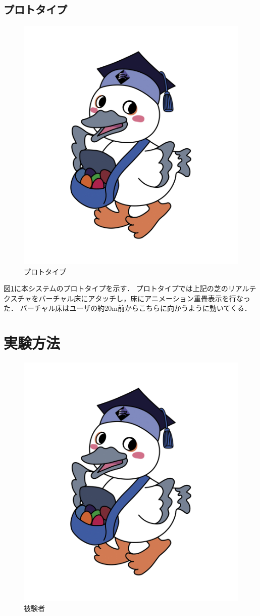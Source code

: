 \documentclass[dvipdfmx]{jsarticle}
\begin{document}
\subsection{プロトタイプ}
\begin{figure}[htbp]
    \centering
    \includegraphics[width=0.7\linewidth]{fig/koukaton.jpg}
    \caption{プロトタイプ}
    \label{fig:puroto}
\end{figure}
図\ref{fig:puroto}に本システムのプロトタイプを示す．
プロトタイプでは上記の芝のリアルテクスチャをバーチャル床にアタッチし，床にアニメーション重畳表示を行なった．
バーチャル床はユーザの約20m前からこちらに向かうように動いてくる．
\section{実験方法}
\begin{figure}[htbp]
    \centering
    \includegraphics[width=0.7\linewidth]{fig/koukaton.jpg}
    \caption{被験者}
    \label{fig:kokaton}
\end{figure}
\end{document}
